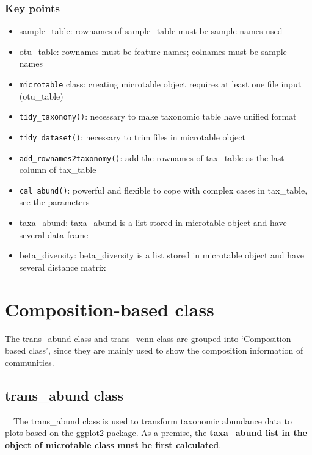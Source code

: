 \documentclass[
]{book}
\providecommand{\tightlist}{%
  \setlength{\itemsep}{0pt}\setlength{\parskip}{0pt}}
\begin{document}
\hypertarget{key-points}{%
\subsection{Key points}\label{key-points}}

\begin{itemize}
\tightlist
\item
  sample\_table: rownames of sample\_table must be sample names used
\item
  otu\_table: rownames must be feature names; colnames must be sample names
\item
  \texttt{microtable} class: creating microtable object requires at least one file input (otu\_table)
\item
  \texttt{tidy\_taxonomy()}: necessary to make taxonomic table have unified format
\item
  \texttt{tidy\_dataset()}: necessary to trim files in microtable object
\item
  \texttt{add\_rownames2taxonomy()}: add the rownames of tax\_table as the last column of tax\_table
\item
  \texttt{cal\_abund()}: powerful and flexible to cope with complex cases in tax\_table, see the parameters
\item
  taxa\_abund: taxa\_abund is a list stored in microtable object and have several data frame
\item
  beta\_diversity: beta\_diversity is a list stored in microtable object and have several distance matrix
\end{itemize}

\hypertarget{composition-based-class}{%
\chapter{Composition-based class}\label{composition-based-class}}

The trans\_abund class and trans\_venn class are grouped into `Composition-based class',
since they are mainly used to show the composition information of communities.

\hypertarget{trans_abund-class}{%
\section{trans\_abund class}\label{trans_abund-class}}

　The trans\_abund class is used to transform taxonomic abundance data to plots based on the ggplot2 package.
As a premise, the \textbf{taxa\_abund list in the object of microtable class must be first calculated}.
\end{document}
